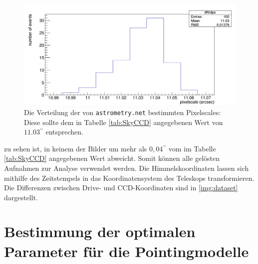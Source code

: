 \begin{figure}[htbp]
\centering
\includegraphics[width=\textwidth]{../341/histo.png}
\caption{Die Verteilung der von \texttt{astrometry.net} bestimmten Pixelscales: Diese sollte dem in Tabelle \ref{tab:SkyCCD} angegebenen Wert von $11.03\unit{^{\prime\prime}}$ entsprechen.}
\label{img:ps}
\end{figure}
zu sehen ist, in keinem der Bilder um mehr als $0,04\unit{^{\prime\prime}}$ vom im Tabelle \ref{tab:SkyCCD} angegebenen Wert abweicht. Somit können alle gelösten Aufnahmen zur Analyse verwendet werden. Die Himmelskoordinaten lassen sich mithilfe des Zeitstempels in das Koordinatensystem des Teleskops transformieren. Die Differenzen zwischen Drive- und CCD-Koordinaten sind in \ref{img:dataset} dargestellt.
\section{Bestimmung der optimalen Parameter für die Pointingmodelle}

